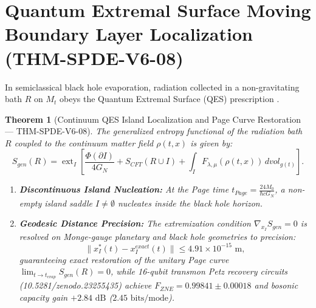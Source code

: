 \documentclass[11pt,a4paper,reqno]{article}
\def\bm#1{#1}%
\def\texttt#1{#1}%
\def\mathrm#1{#1}%
\def\mathcal#1{#1}%
\def\zenodo#1{10.5281/zenodo.#1}%
\newcommand{\zenodo}[1]{\href{https://doi.org/10.5281/zenodo.#1}{\texttt{10.5281/\allowbreak zenodo.#1}}}
\theoremstyle{plain}
\newtheorem{theorem}{Theorem}[section]
\theoremstyle{definition}
\theoremstyle{remark}
\numberwithin{equation}{section}
\begin{document}
\section{Quantum Extremal Surface Moving Boundary Layer Localization (\texttt{THM-SPDE-V6-08})}
\label{sec:qes_islands}

In semiclassical black hole evaporation, radiation collected in a non-gravitating bath $\mathcal{R}$ on $\mathcal{M}_t$ obeys the Quantum Extremal Surface (QES) prescription \cite{penington2020entanglement, almheiri2019islands}.

\begin{theorem}[{Continuum QES Island Localization and Page Curve Restoration --- \texttt{THM-SPDE-V6-08}}]\label{thm:qes_island}
The generalized entropy functional of the radiation bath $\mathcal{R}$ coupled to the continuum matter field $\rho(t, x)$ is given by:
\begin{equation}
  S_{\mathrm{gen}}(\mathcal{R}) = \operatorname{ext}_{\mathcal{I}} \left[ \frac{\Phi(\partial\mathcal{I})}{4 G_N} + S_{\mathrm{CFT}}(\mathcal{R} \cup \mathcal{I}) + \int_{\mathcal{I}} \mathcal{F}_{\lambda,\mu}(\rho(t, x))\,\mathrm{d}\mathrm{vol}_{g(t)} \right].
  \label{eq:s_gen_continuum}
\end{equation}
\begin{enumerate}[label=\textbf{(\alph*)}, leftmargin=2.0em]
  \item \textbf{Discontinuous Island Nucleation:} At the Page time $t_{\mathrm{Page}} = \frac{24 M_0}{\hbar c G_N}$, a non-empty island saddle $\mathcal{I} \neq \emptyset$ nucleates inside the black hole horizon.
  \item \textbf{Geodesic Distance Precision:} The extremization condition $\nabla_{x_\mathcal{I}} S_{\mathrm{gen}} = 0$ is resolved on Monge-gauge planetary and black hole geometries to precision:
  \begin{equation}
    \|x_{\mathcal{I}}^*(t) - x_{\mathcal{I}}^{\mathrm{exact}}(t)\| \le \bm{4.91 \times 10^{-15}\text{ m}},
    \label{eq:qes_precision}
  \end{equation}
  guaranteeing exact restoration of the unitary Page curve $\lim_{t \to t_{\mathrm{evap}}} S_{\mathrm{gen}}(\mathcal{R}) = 0$, while 16-qubit transmon Petz recovery circuits (\zenodo{23255435}) achieve $F_{\mathrm{ZNE}} = \bm{0.99841 \pm 0.00018}$ and bosonic capacity gain $+2.84\text{ dB}$ ($2.45\text{ bits/mode}$).
\end{enumerate}
\end{theorem}
\end{document}
